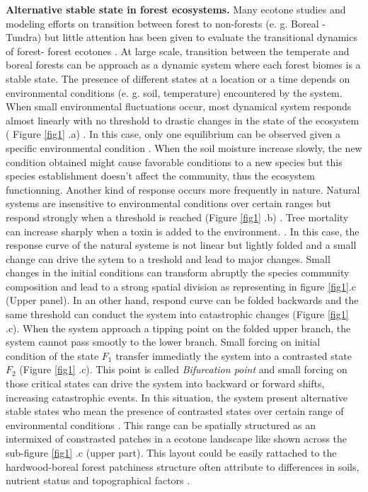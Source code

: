 \textbf{Alternative stable state in forest ecosystems.}  Many ecotone studies and modeling efforts on
transition between forest to non-forests (e. g. Boreal - Tundra)
\cite{Scheffer2012,Scheffer2001,Hirota2011,Messaoud2007} but little attention has been
given to evaluate the transitional dynamics of forest- forest ecotones
\cite{Goldblum2010,Graignic2013}. At large scale, transition between  the
temperate and boreal forests can be approach as a dynamic system where each
forest biomes is a stable state. The presence of different states at a
location or a time depends on environmental conditions (e. g. soil,
temperature) encountered by the system. When small environmental fluctuations
occur, most dynamical system responds almost linearly with no threshold to
drastic changes in the state of the ecosystem ( Figure \ref{fig1} .a)
\cite{Scheffer2001,Scheffer2009}. In this case, only one equilibrium can be
observed given a specific environmental condition
\cite{Scheffer2001,Scheffer2009,scheffer2009critical}.  When the soil moisture
increase slowly, the new condition obtained might cause favorable conditions
to a new species but this species establishment doesn't affect the community,
thus the ecosystem functionning. Another kind of response occurs more
frequently in nature.  Natural systems are insensitive to environmental
conditions over certain ranges but respond strongly when a threshold is
reached (Figure \ref{fig1} .b) \cite{scheffer2009critical}. Tree mortality can
increase sharply when a toxin is added to the environment.
\cite{scheffer2009critical}. In this case, the response curve of the natural
systeme is not linear but lightly folded and a small change can drive the
sytem to a treshold and lead to major changes. Small changes in the initial
conditions can transform abruptly the species community composition and lead
to a strong spatial division as representing in figure \ref{fig1}.c (Upper
panel). In an other hand, respond curve can be folded backwards and the same
threshold can conduct the system into catastrophic changes (Figure \ref{fig1}
.c).  When the system approach a tipping point on the folded upper branch, the
system cannot pass smootly to the lower branch. Small forcing on initial
condition of the state $F_1$ transfer immediatly the system into a contrasted
state $F_2$ (Figure \ref{fig1} .c). This point is called \textit{Bifurcation
point} and small forcing on those critical states can drive the system into
backward or forward shifts, increasing catastrophic events. In this situation,
the system present alternative stable states who mean the presence of
contrasted states over certain range of environmental conditions
\cite{scheffer2009critical}. This range can be spatially structured as an
intermixed of constrasted patches in a ecotone landscape like shown across the
sub-figure \ref{fig1} .c (upper part). This layout could be easily rattached
to the hardwood-boreal forest patchiness structure often attribute to
differences in soils, nutrient status and topographical factors \cite{Society2014}.\\

